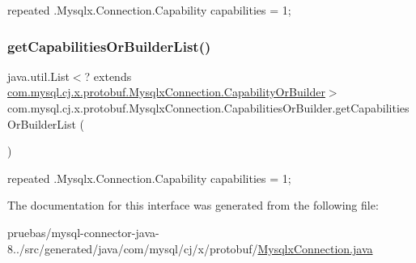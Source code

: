 {\ttfamily repeated .Mysqlx.\+Connection.\+Capability capabilities = 1;} \mbox{\label{interfacecom_1_1mysql_1_1cj_1_1x_1_1protobuf_1_1_mysqlx_connection_1_1_capabilities_or_builder_a86be66e7a1557c55d7fc3ccd6e6c1639}} 
\subsubsection{\texorpdfstring{get\+Capabilities\+Or\+Builder\+List()}{getCapabilitiesOrBuilderList()}}
{\footnotesize\ttfamily java.\+util.\+List$<$? extends \mbox{\hyperlink{interfacecom_1_1mysql_1_1cj_1_1x_1_1protobuf_1_1_mysqlx_connection_1_1_capability_or_builder}{com.\+mysql.\+cj.\+x.\+protobuf.\+Mysqlx\+Connection.\+Capability\+Or\+Builder}}$>$ com.\+mysql.\+cj.\+x.\+protobuf.\+Mysqlx\+Connection.\+Capabilities\+Or\+Builder.\+get\+Capabilities\+Or\+Builder\+List (\begin{DoxyParamCaption}{ }\end{DoxyParamCaption})}

{\ttfamily repeated .Mysqlx.\+Connection.\+Capability capabilities = 1;} 

The documentation for this interface was generated from the following file\+:\begin{DoxyCompactItemize}
\item 
pruebas/mysql-\/connector-\/java-\/8../src/generated/java/com/mysql/cj/x/protobuf/\mbox{\hyperlink{_mysqlx_connection_8java}{Mysqlx\+Connection.\+java}}\end{DoxyCompactItemize}
